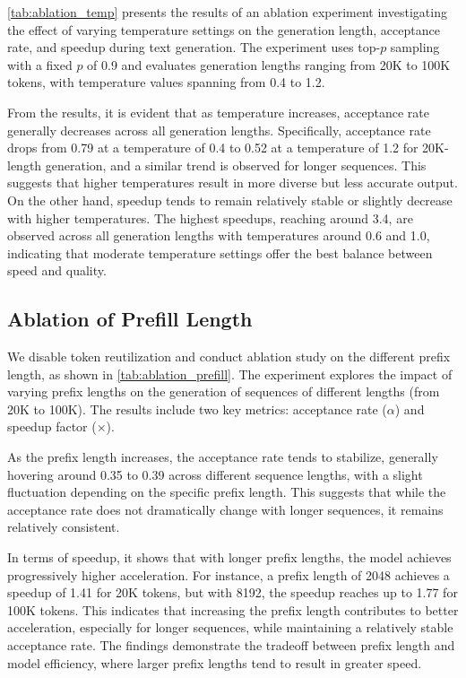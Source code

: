 \cref{tab:ablation_temp} presents the results of an ablation experiment investigating the effect of varying temperature settings on the generation length, acceptance rate, and speedup during text generation. The experiment uses top-$p$ sampling with a fixed $p$ of 0.9 and evaluates generation lengths ranging from 20K to 100K tokens, with temperature values spanning from 0.4 to 1.2.

From the results, it is evident that as temperature increases, acceptance rate generally decreases across all generation lengths. Specifically, acceptance rate drops from 0.79 at a temperature of 0.4 to 0.52 at a temperature of 1.2 for 20K-length generation, and a similar trend is observed for longer sequences. This suggests that higher temperatures result in more diverse but less accurate output. On the other hand, speedup tends to remain relatively stable or slightly decrease with higher temperatures. The highest speedups, reaching around 3.4, are observed across all generation lengths with temperatures around 0.6 and 1.0, indicating that moderate temperature settings offer the best balance between speed and quality.




\subsection{Ablation of Prefill Length}
\label{sec:ablation_prefill}
We disable token reutilization and conduct ablation study on the different prefix length, as shown in \cref{tab:ablation_prefill}. The experiment explores the impact of varying prefix lengths on the generation of sequences of different lengths (from 20K to 100K). The results include two key metrics: acceptance rate ($\alpha$) and speedup factor ($\times$). 

As the prefix length increases, the acceptance rate tends to stabilize, generally hovering around 0.35 to 0.39 across different sequence lengths, with a slight fluctuation depending on the specific prefix length. This suggests that while the acceptance rate does not dramatically change with longer sequences, it remains relatively consistent.



In terms of speedup, it shows that with longer prefix lengths, the model achieves progressively higher acceleration. For instance, a prefix length of 2048 achieves a speedup of 1.41 for 20K tokens, but with 8192, the speedup reaches up to 1.77 for 100K tokens. This indicates that increasing the prefix length contributes to better acceleration, especially for longer sequences, while maintaining a relatively stable acceptance rate. The findings demonstrate the tradeoff between prefix length and model efficiency, where larger prefix lengths tend to result in greater speed.


